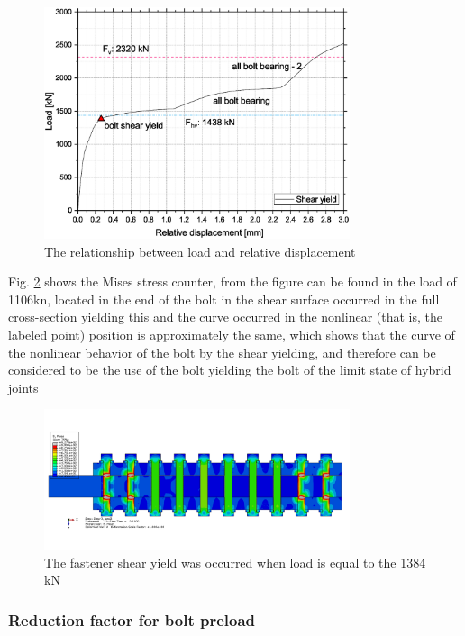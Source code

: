 \begin{figure}[htbp]
    \centering
    \includegraphics[width=0.8\textwidth]{imgs/ch7/M16b4-2.eps}
    \caption{The relationship between load and relative displacement}
    \label{fig-m16b4}
\end{figure}

Fig. \ref{fig-m16b4fvf} shows the Mises stress counter, from the figure can be found in the load of 1106kn, located in the end of the bolt in the shear surface occurred in the full cross-section yielding this and the curve occurred in the nonlinear (that is, the labeled point) position is approximately the same, which shows that the curve of the nonlinear behavior of the bolt by the shear yielding, and therefore can be considered to be the use of the bolt yielding the bolt of the limit state of hybrid joints

\begin{figure}[htbp]
    \centering
    \includegraphics[width=0.8\textwidth]{imgs/ch7/M16b4-fvfst.png}
    \caption{The fastener shear yield was occurred when load is equal to the 1384 kN}
    \label{fig-m16b4fvf}
\end{figure}


\subsubsection{Reduction factor for bolt preload}

